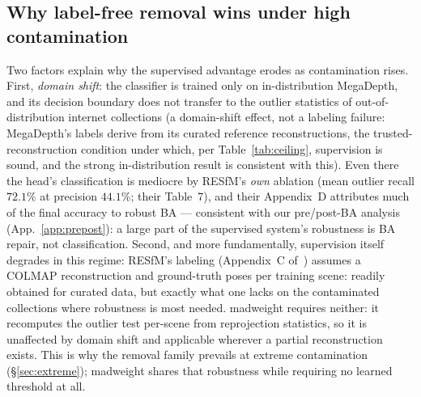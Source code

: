 \documentclass{article}
\newcommand{\mad}{madweight}
\begin{document}
\subsection{Why label-free removal wins under high contamination}\label{sec:whyremoval}
Two factors explain why the supervised advantage erodes as contamination rises.
First, \emph{domain shift}: the classifier is trained only on in-distribution MegaDepth,
and its decision boundary does not transfer to the outlier statistics of
out-of-distribution internet collections (a domain-shift effect, not a labeling failure:
MegaDepth's labels derive from its curated reference reconstructions, the
trusted-reconstruction condition under which, per Table~\ref{tab:ceiling}, supervision
is sound, and the strong in-distribution result is consistent with this). Even there the
head's classification is mediocre by RESfM's \emph{own} ablation (mean outlier recall
$72.1\%$ at precision $44.1\%$; their Table~7), and their Appendix~D attributes much of
the final accuracy to robust BA --- consistent with our pre/post-BA analysis
(App.~\ref{app:prepost}): a large part of the supervised system's robustness is BA
repair, not classification. Second, and more
fundamentally, supervision itself degrades in this regime: RESfM's labeling (Appendix~C
of~\citep{resfm}) assumes a COLMAP reconstruction and ground-truth poses per training
scene: readily obtained for curated data, but exactly what one lacks on the contaminated
collections where robustness is most needed. \mad{} requires neither: it recomputes the
outlier test per-scene from reprojection statistics, so it is unaffected by domain shift
and applicable wherever a partial reconstruction exists. This is why the removal family
prevails at extreme contamination (\S\ref{sec:extreme}); \mad{} shares that robustness
while requiring no learned threshold at all.
\end{document}
